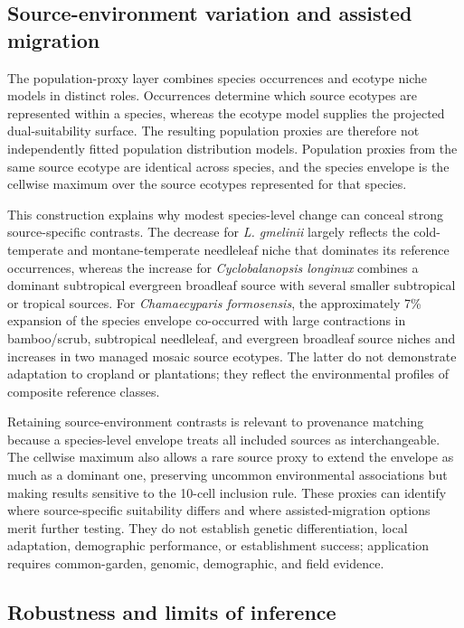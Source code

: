\documentclass[11pt]{article}
\begin{document}
\subsection{Source-environment variation and assisted migration}

The population-proxy layer combines species occurrences and ecotype niche
models in distinct roles. Occurrences determine which source ecotypes are
represented within a species, whereas the ecotype model supplies the projected
dual-suitability surface. The resulting population proxies are therefore not
independently fitted population distribution models. Population proxies from
the same source ecotype are identical across species, and the species envelope
is the cellwise maximum over the source ecotypes represented for that species.

This construction explains why modest species-level change can conceal strong
source-specific contrasts. The decrease for \textit{L. gmelinii} largely
reflects the cold-temperate and montane-temperate needleleaf niche that
dominates its reference occurrences, whereas the increase for
\textit{Cyclobalanopsis longinux} combines a dominant subtropical evergreen
broadleaf source with several smaller subtropical or tropical sources. For
\textit{Chamaecyparis formosensis}, the approximately 7\% expansion of the
species envelope co-occurred with large contractions in bamboo/scrub,
subtropical needleleaf, and evergreen broadleaf source niches and increases in
two managed mosaic source ecotypes. The latter do not demonstrate adaptation
to cropland or plantations; they reflect the environmental profiles of
composite reference classes.

Retaining source-environment contrasts is relevant to provenance matching
because a species-level envelope treats all included sources as interchangeable.
The cellwise maximum also allows a rare source proxy to extend the envelope as
much as a dominant one, preserving uncommon environmental associations but
making results sensitive to the 10-cell inclusion rule. These proxies can
identify where source-specific suitability differs and where assisted-migration
options merit further testing. They do not establish genetic differentiation,
local adaptation, demographic performance, or establishment success;
application requires common-garden, genomic, demographic, and field evidence.

\subsection{Robustness and limits of inference}
\end{document}
